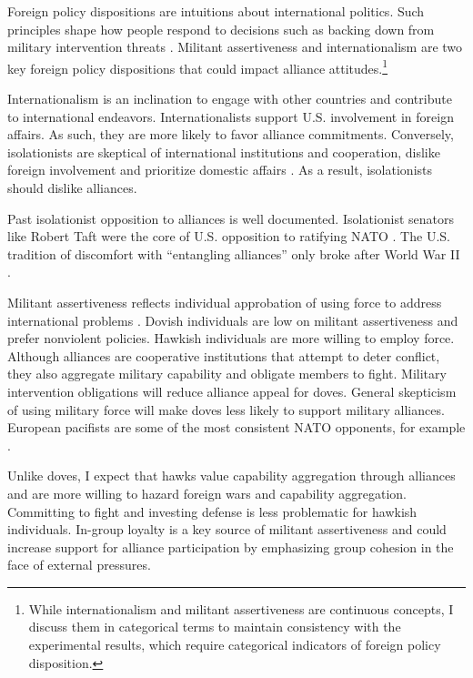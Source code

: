 \documentclass[12pt]{article}
\begin{document}
Foreign policy dispositions are intuitions about international politics. 
Such principles shape how people respond to decisions such as backing down from military intervention threats \citep{KertzerBrutger2016}. 
Militant assertiveness and internationalism are two key foreign policy dispositions \citep{Herrmannetal1999} that could impact alliance attitudes.\footnote{While internationalism and militant assertiveness are continuous concepts, I discuss them in categorical terms to maintain consistency with the experimental results, which require categorical indicators of foreign policy disposition.}


Internationalism is an inclination to engage with other countries and contribute to international endeavors. 
Internationalists support U.S. involvement in foreign affairs.
As such, they are more likely to favor alliance commitments. 
Conversely, isolationists are skeptical of international institutions and cooperation, dislike foreign involvement and prioritize domestic affairs \citep{Kertzer2013}. 
As a result, isolationists should dislike alliances.  


Past isolationist opposition to alliances is well documented. 
Isolationist senators like Robert Taft were the core of U.S. opposition to ratifying NATO \citep{Kaplan2007}.
The U.S. tradition of discomfort with ``entangling alliances'' only broke after World War II \citep{Kupchan2020}.


Militant assertiveness reflects individual approbation of using force to address international problems \citep{Herrmannetal1999}. 
Dovish individuals are low on militant assertiveness and prefer nonviolent policies.
Hawkish individuals are more willing to employ force.
Although alliances are cooperative institutions that attempt to deter conflict, they also aggregate military capability and obligate members to fight.
Military intervention obligations will reduce alliance appeal for doves.
General skepticism of using military force will make doves less likely to support military alliances.  
European pacifists are some of the most consistent NATO opponents, for example \citep{Thies2015}.


Unlike doves, I expect that hawks value capability aggregation through alliances and are more willing to hazard foreign wars and capability aggregation. 
Committing to fight and investing defense is less problematic for hawkish individuals. 
In-group loyalty is a key source of militant assertiveness \citep{Kertzeretal2014} and could increase support for alliance participation by emphasizing group cohesion in the face of external pressures.
\end{document}
